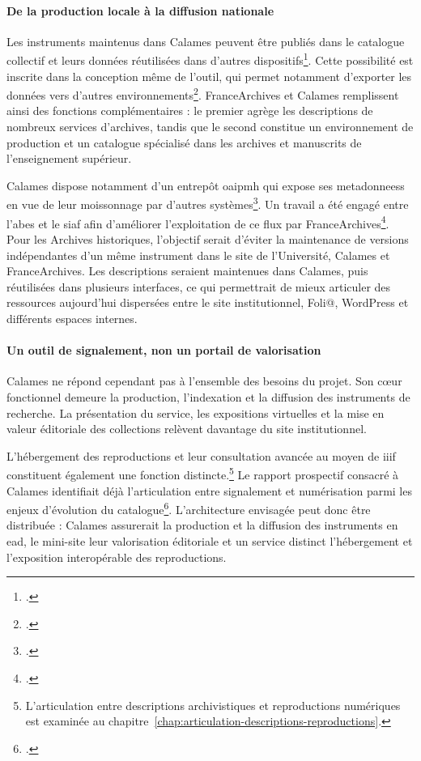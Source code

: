 \paragraph{De la production locale à la diffusion nationale}

Les instruments maintenus dans Calames peuvent être publiés dans le catalogue collectif et leurs données réutilisées dans d'autres dispositifs\footcite{ABESReutilisationCalames}. Cette possibilité est inscrite dans la conception même de l'outil, qui permet notamment d'exporter les données vers d'autres environnements\footcite{Nicolas2008CalamesCatalogage}. FranceArchives et Calames remplissent ainsi des fonctions complémentaires : le premier agrège les descriptions de nombreux services d'archives, tandis que le second constitue un environnement de production et un catalogue spécialisé dans les archives et manuscrits de l'enseignement supérieur.

Calames dispose notamment d'un entrepôt \gls{oaipmh} qui expose ses \glspl{metadonnees} en vue de leur \gls{moissonnage} par d'autres systèmes\footcite{ABESOAICalames2017}. Un travail a été engagé entre l'\Gls{abes} et le \gls{siaf} afin d'améliorer l'exploitation de ce flux par FranceArchives\footcite{MichelNaddeo2023}. Pour les Archives historiques, l'objectif serait d'éviter la maintenance de versions indépendantes d'un même instrument dans le site de l'Université, Calames et FranceArchives. Les descriptions seraient maintenues dans Calames, puis réutilisées dans plusieurs interfaces, ce qui permettrait de mieux articuler des ressources aujourd'hui dispersées entre le site institutionnel, Foli@, WordPress et différents espaces internes.

\paragraph{Un outil de signalement, non un portail de valorisation}

Calames ne répond cependant pas à l'ensemble des besoins du projet. Son cœur fonctionnel demeure la production, l'indexation et la diffusion des instruments de recherche. La présentation du service, les expositions virtuelles et la mise en valeur éditoriale des collections relèvent davantage du site institutionnel.

L'hébergement des reproductions et leur consultation avancée au moyen de \gls{iiif} constituent également une fonction distincte.\footnote{L'articulation entre descriptions archivistiques et reproductions numériques est examinée au chapitre~\ref{chap:articulation-descriptions-reproductions}.} Le rapport prospectif consacré à Calames identifiait déjà l'articulation entre \gls{signalement} et numérisation parmi les enjeux d'évolution du catalogue\footcite{ABESCalamesBilan2014}. L'architecture envisagée peut donc être distribuée : Calames assurerait la production et la diffusion des instruments en \gls{ead}, le mini-site leur valorisation éditoriale et un service distinct l'hébergement et l'exposition interopérable des reproductions.


